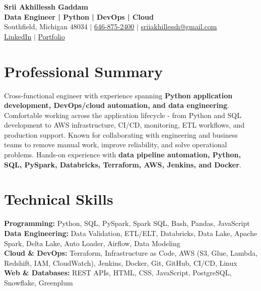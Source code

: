 \documentclass[letterpaper,10pt]{article}
\begin{document}
\fontsize{9.35pt}{10.45pt}\selectfont

\begin{center}
    {\LARGE \textbf{Srii Akhillessh Gaddam}} \\[-1pt]
    \textbf{Data Engineer | Python | DevOps | Cloud} \\[2pt]
    Southfield, Michigan 48034 $|$
    \href{tel:6468752400}{646-875-2400} $|$
    \href{mailto:sriiakhillessh@gmail.com}{sriiakhillessh@gmail.com} \\[1pt]
    \href{https://www.linkedin.com/in/srii-akhiilessh-gaddam-b48668191/}{LinkedIn} $|$
    \href{https://sriiakhillesshg.github.io/portfolio/}{Portfolio}
\end{center}
\vspace{-8pt}

\section{Professional Summary}
\small{Cross-functional engineer with experience spanning \textbf{Python application development, DevOps/cloud automation, and data engineering}. Comfortable working across the application lifecycle - from Python and SQL development to AWS infrastructure, CI/CD, monitoring, ETL workflows, and production support. Known for collaborating with engineering and business teams to remove manual work, improve reliability, and solve operational problems. Hands-on experience with \textbf{data pipeline automation, Python, SQL, PySpark, Databricks, Terraform, AWS, Jenkins, and Docker}.}

\section{Technical Skills}
\small{
\textbf{Programming:} Python, SQL, PySpark, Spark SQL, Bash, Pandas, JavaScript \\
\textbf{Data Engineering:} Data Validation, ETL/ELT, Databricks, Data Lake, Apache Spark, Delta Lake, Auto Loader, Airflow, Data Modeling \\
\textbf{Cloud \& DevOps:} Terraform, Infrastructure as Code, AWS (S3, Glue, Lambda, Redshift, IAM, CloudWatch), Jenkins, Docker, Git, GitHub, CI/CD, Linux \\
\textbf{Web \& Databases:} REST APIs, HTML, CSS, JavaScript, PostgreSQL, Snowflake, Greenplum
}
\end{document}
